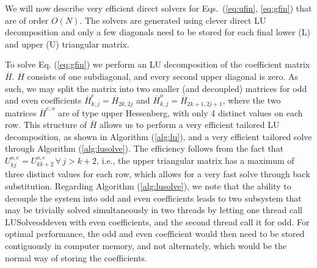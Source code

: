 \documentclass[11pt, oneside]{article}
\newcommand{\D}[1]{\overline{#1}}
\begin{document}
We will now describe very efficient direct solvers for Eqs.~(\ref{eq:ufin}, 
\ref{eq:gfin}) that are of order $O(N)$. The solvers are generated using clever 
direct LU decomposition and only a few diagonals need to be stored for each 
final lower (L) and upper (U) triangular matrix. 

To solve Eq. (\ref{eq:gfin}) we perform an LU decomposition of the coefficient 
matrix $\D{H}$. $\D{H}$ consists of one subdiagonal, and every 
second upper diagonal is zero. As such, we may split the matrix into two 
smaller (and decoupled) matrices for odd and even coefficients $\D{H}^e_{k,j} = 
\D{H}_{2k,2j}$ and $\D{H}^o_{k,j} = \D{H}_{2k+1,2j+1}$, where the two matrices 
$\D{H}^{e,o}$ are of type upper 
Hessenberg, with only 4 distinct values on each row. This structure of $\D{H}$ 
allows us to perform a very efficient tailored LU decomposition, as shown in 
Algorithm (\ref{alg:lu}), and a very efficient tailored solve through 
Algorithm (\ref{alg:lusolve}). The efficiency follows from the fact that 
$U^{o,e}_{kj} = U^{o,e}_{kk+2} \, \forall \, j > k+2$, i.e., the upper 
triangular matrix has a maximum of three distinct values for each row, which 
allows for a very fast solve through back substitution. 
Regarding Algorithm 
(\ref{alg:lusolve}), we note that the ability to decouple the system into odd 
and even coefficients leads to two subsystem that may be trivially solved 
simultaneously in two threads by letting one thread call LUSolveoddeven with 
even coefficients, and the second thread call it for odd. For optimal 
performance, the odd and even coefficient would then need to be stored 
contiguously in computer memory, and not alternately, which would be the normal 
way of storing the coefficients.
\end{document}
